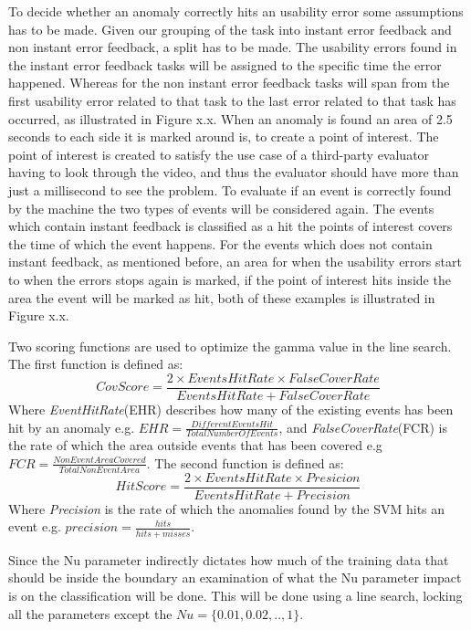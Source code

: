 To decide whether an anomaly correctly hits an usability error some assumptions has to be made. Given our grouping of the task into instant error feedback and non instant error feedback, a split has to be made. The usability errors found in the instant error feedback tasks will be assigned to the specific time the error happened. Whereas for the non instant error feedback tasks will span from the first usability error related to that task to the last error related to that task has occurred, as illustrated in Figure x.x.
When an anomaly is found an area of 2.5 seconds to each side it is marked around is, to create a point of interest. The point of interest is created to satisfy the use case of a third-party evaluator having to look through the video, and thus the evaluator should have more than just a millisecond to see the problem.
To evaluate if an event is correctly found by the machine the two types of events will be considered again.
The events which contain instant feedback is classified as a hit the points of interest covers the time of which the event happens.
For the events which does not contain instant feedback, as mentioned before, an area for when the usability errors start to when the errors stops again is marked, if the point of interest hits inside the area the event will be marked as hit, both of these examples is illustrated in Figure x.x. 

Two scoring functions are used to optimize the gamma value in the line search. The first function is defined as: 
\[CovScore = \frac{2 \times EventsHitRate \times FalseCoverRate}{EventsHitRate + FalseCoverRate}\]
Where \textit{EventHitRate}(EHR) describes how many of the existing events has been hit by an anomaly e.g. $EHR = \frac{DifferentEventsHit}{TotalNumberOfEvents}$, and \textit{FalseCoverRate}(FCR) is the rate of which the area outside events that has been covered e.g $FCR = \frac{NonEventAreaCovered}{TotalNonEventArea}$. 
The second function is defined as: 
\[HitScore = \frac{2 \times EventsHitRate \times Presicion}{EventsHitRate + Precision}\]
Where \textit{Precision} is the rate of which the anomalies found by the SVM hits an event e.g. $precision = \frac{hits}{hits+misses}$. 

Since the Nu parameter indirectly dictates how much of the training data that should be inside the boundary an examination of what the Nu parameter impact is on the classification will be done.
This will be done using a line search, locking all the parameters except the $Nu = \{0.01, 0.02,.., 1\}$. 





